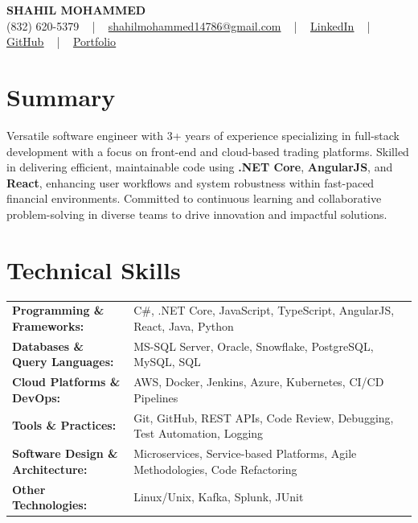 \documentclass[letterpaper,11pt]{article}
\begin{document}
\begin{center}
    {\fontsize{14pt}{12pt}\selectfont \textbf{\MakeUppercase{Shahil Mohammed}}}\\ \vspace{2pt}
    \fontsize{10pt}{12pt}\selectfont (832) 620-5379 ~ | ~ \href{mailto:shahilmohammed14786@gmail.com}{shahilmohammed14786@gmail.com} ~ | ~  
    \href{https://www.linkedin.com/in/shahil-mohammed-9652931a1/}{\color{blue}\underline{LinkedIn}}  ~ | ~ 
    \href{https://github.com/freakbeast14}{\color{blue}\underline{GitHub}} ~ | ~ 
    \href{https://shahil-mohammed.netlify.app/}{\color{blue}\underline{Portfolio}}
    \vspace{-8pt}
\end{center}

\section{Summary}
\fontsize{9pt}{10pt}\selectfont
Versatile software engineer with 3+ years of experience specializing in full-stack development with a focus on front-end and cloud-based trading platforms. Skilled in delivering efficient, maintainable code using \textbf{.NET Core}, \textbf{AngularJS}, and \textbf{React}, enhancing user workflows and system robustness within fast-paced financial environments. Committed to continuous learning and collaborative problem-solving in diverse teams to drive innovation and impactful solutions.
 \vspace{-5pt}
 
\section{Technical Skills}
        \vspace{-14pt}
        \begin{table}[h]
            \fontsize{9pt}{10pt}\selectfont
            \begin{tabular}{p{0.3\linewidth} p{0.7\linewidth}}
                \textbf{Programming \& Frameworks:} & C\#, .NET Core, JavaScript, TypeScript, AngularJS, React, Java, Python \\
                \textbf{Databases \& Query Languages:} & MS-SQL Server, Oracle, Snowflake, PostgreSQL, MySQL, SQL \\
                \textbf{Cloud Platforms \& DevOps:} & AWS, Docker, Jenkins, Azure, Kubernetes, CI/CD Pipelines \\
                \textbf{Tools \& Practices:} & Git, GitHub, REST APIs, Code Review, Debugging, Test Automation, Logging \\
                \textbf{Software Design \& Architecture:} & Microservices, Service-based Platforms, Agile Methodologies, Code Refactoring \\
                \textbf{Other Technologies:} & Linux/Unix, Kafka, Splunk, JUnit \\
            \end{tabular}
        \end{table}
 \vspace{-15pt}
 
\end{document}
